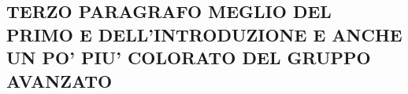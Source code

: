 \subsection{TERZO PARAGRAFO MEGLIO DEL PRIMO E DELL'INTRODUZIONE E ANCHE UN PO' PIU' COLORATO DEL GRUPPO AVANZATO}